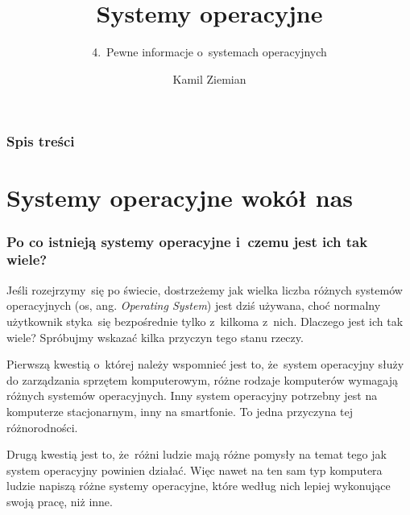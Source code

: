 \documentclass[10pt,t]{beamer}
\title{Systemy operacyjne}
\subtitle{4.~Pewne informacje o~systemach operacyjnych}
\author{Kamil Ziemian \\
  \email}
\begin{document}





\RaggedRight





\maketitle





\begin{frame}
  \frametitle{Spis treści}


  \tableofcontents

\end{frame}










\section{Systemy operacyjne wokół nas}


\begin{frame}
  \frametitle{Po co istnieją systemy operacyjne i~czemu jest ich
    tak wiele?}


  Jeśli rozejrzymy~się po świecie, dostrzeżemy jak wielka liczba różnych
  systemów operacyjnych (os, ang. \textit{Operating System}) jest dziś
  używana, choć normalny użytkownik
  styka~się bezpośrednie tylko z~kilkoma z~nich. Dlaczego jest ich tak
  wiele? Spróbujmy wskazać kilka przyczyn tego stanu rzeczy.

  Pierwszą kwestią o~której należy wspomnieć jest to, że~system operacyjny
  służy do zarządzania sprzętem komputerowym, różne rodzaje komputerów
  wymagają różnych systemów operacyjnych. Inny system operacyjny potrzebny
  jest na komputerze stacjonarnym, inny na smartfonie. To jedna przyczyna
  tej różnorodności.

  Drugą kwestią jest to, że~różni ludzie mają różne pomysły na temat tego
  jak system operacyjny powinien działać. Więc nawet na ten sam typ
  komputera ludzie napiszą różne systemy operacyjne, które według nich
  lepiej wykonujące swoją pracę, niż inne.

\end{frame}
\end{document}
